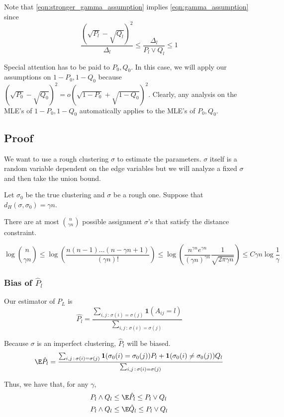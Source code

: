 \documentclass{article}
\begin{document}
Note that \ref{eqn:stronger_gamma_assumption} implies \ref{eqn:gamma_assumption} since
\[
\frac{ (\sqrt{P_l} - \sqrt{Q_l})^2}{\Delta_l} \leq 
 \frac{ \Delta_l}{P_l \vee Q_l} \leq 1
\]


Special attention has to be paid to $P_0, Q_0$. In this case, we will apply our assumptions on $1-P_0, 1-Q_0$ because $(\sqrt{P_0} - \sqrt{Q_0})^2 = o(\sqrt{1-P_0} + \sqrt{1-Q_0})^2$. 
Clearly, any analysis on the MLE's of $1-P_0, 1-Q_0$ automatically applies to the MLE's of $P_0, Q_0$. 

\subsection{Proof} 

We want to use a rough clustering $\sigma$ to estimate the parameters. $\sigma$ itself is a random variable dependent on the edge variables but we will analyze a fixed $\sigma$ and then take the union bound.

Let $\sigma_0$ be the true clustering and $\sigma$ be a rough one. 
Suppose that $d_H(\sigma, \sigma_0) = \gamma n$.

There are at most $\binom{n}{\gamma n}$ possible assignment $\sigma$'s that satisfy the distance constraint. 

\[
\log \binom{n}{\gamma n} \leq 
  \log \left( \frac{ n(n-1) ...(n-\gamma n+1) }{(\gamma n)!} \right) \leq
  \log \left( \frac{ n^{\gamma n} e^{\gamma n} }
     { (\gamma n)^{\gamma n} } \frac{1}{\sqrt{2\pi \gamma n}} \right)
 \leq C \gamma n \log \frac{1}{\gamma} 
\]



\subsubsection{Bias of $\hat{P}_l$}


Our estimator of $P_L$ is 
\[
\hat{P_l} = \frac{ \sum_{i,j \,:\, \sigma(i) = \sigma(j)} \mathbf{1}(A_{ij} = l) }{
                   \sum_{i,j \,:\, \sigma(i) = \sigma(j)} }
\]

Because $\sigma$ is an imperfect clustering, $\hat{P}_l$ will be biased. 
\[
\E \hat{P_l} = 
   \frac{ \sum_{i,j \,:\, \sigma(i) = \sigma(j)} \mathbf{1}(\sigma_0(i) = \sigma_0(j) ) P_l + 
               \mathbf{1}(\sigma_0(i) \neq \sigma_0(j)) Q_l }{
                   \sum_{i,j \,:\, \sigma(i) = \sigma(j)} }
\]

Thus, we have that, for any $\gamma$,
\begin{align}
P_l \wedge Q_l &\leq \E \hat{P}_l \leq P_l \vee Q_l \label{eqn:bias_simple_bound} \\
P_l \wedge Q_l &\leq \E \hat{Q}_l \leq P_l \vee Q_l \nonumber
\end{align}
\end{document}
